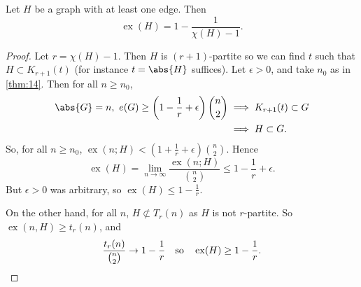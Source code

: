 \documentclass{article}
\DeclareMathOperator{\ext}{ex}
\begin{document}
\begin{ncor}\label{cor:15}
    Let $H$ be a graph with at least one edge. Then
    \begin{equation*}
        \ext(H) = 1 - \frac{1}{\chi(H) - 1}.
    \end{equation*}
\end{ncor}
\begin{proof}
    Let $r = \chi(H) - 1$.
    Then $H$ is $(r+1)$-partite so we can find $t$ such that $H \subset K_{r+1}(t)$ (for instance $t = \abs{H}$ suffices).
    Let $\epsilon > 0$, and take $n_0$ as in \cref{thm:14}.
    Then for all $n \geq n_0$,
    \begin{align*}
        \abs{G} = n, \ e(G) \geq \left(1 - \frac{1}{r} + \epsilon\right) \binom{n}{2} &\implies K_{r+1}(t) \subset G \\
                                                                           &\implies H \subset G.
    \end{align*}
    So, for all $n \geq n_0$, $\ext(n; H) < (1 + \frac{1}{r} + \epsilon) \binom{n}{2}$. Hence
    \begin{equation*}
        \ext(H) = \lim_{n \to \infty} \frac{\ext(n; H)}{\binom{n}{2}} \leq 1 - \frac{1}{r} + \epsilon.
    \end{equation*}
    But $\epsilon>0$ was arbitrary, so $\ext(H) \leq 1 - \frac{1}{r}$.

    On the other hand, for all $n$, $H \not\subset T_r(n)$ as $H$ is not $r$-partite. So $\ext(n, H) \geq t_r(n)$, and
    \begin{equation*}
        \frac{t_r(n)}{\binom{n}{2}} \to 1 - \frac{1}{r} \quad \text{so} \quad \ext(H) \geq 1 - \frac{1}{r}. \qedhere
    \end{equation*}
\end{proof}
\end{document}

